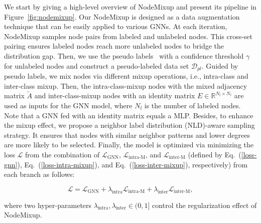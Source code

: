 \documentclass[letterpaper]{article} %
\begin{document}
We start by giving a high-level overview of NodeMixup and present its pipeline in Figure~\ref{fig:nodemixup}. Our NodeMixup is designed as a data augmentation technique that can be easily applied to various GNNs. At each iteration, NodeMixup samples node pairs from labeled and unlabeled nodes. This cross-set pairing ensures labeled nodes reach more unlabeled nodes to bridge the distribution gap. Then, we use the pseudo labels~\cite{pl} with a confidence threshold $\gamma$ for unlabeled nodes and construct a pseudo-labeled data set $\mathcal{D}_{pl}$. Guided by pseudo labels, we mix nodes via different mixup operations, i.e., intra-class and inter-class mixup. Then, the intra-class-mixup nodes with the mixed adjacency matrix $\tilde{A}$ and inter-class-mixup nodes with an identity matrix $E \in \mathbb{R}^{N_{l} \times N_{l}}$ are used as inputs for the GNN model, where $N_{l}$ is the number of labeled nodes. Note that a GNN fed with an identity matrix equals a MLP. Besides, to enhance the mixup effect, we propose a neighbor label distribution (NLD)-aware sampling strategy. It ensures that nodes with similar neighbor patterns and lower degrees are more likely to be selected. Finally, the model is optimized via minimizing the loss $\mathcal{L}$ from the combination of $\mathcal{L}_{\text{GNN}}$, $\mathcal{L}_{\text{intra-M}}$, and $\mathcal{L}_{\text{inter-M}}$ (defined by Eq.~(\ref{loss-gnn}), Eq.~(\ref{loss-intra-mixup}), and Eq.~(\ref{loss-inter-mixup}), respectively) from each branch as follows:
\begin{small}
	\begin{equation}
	\mathcal{L} = \mathcal{L}_{\text{GNN}} + \lambda_{\text{intra}}\mathcal{L}_{\text{intra-M}} + \lambda_{\text{inter}}\mathcal{L}_{\text{inter-M}},
\end{equation}
\end{small}where two hyper-parameters $\lambda_{\text{intra}}, \lambda_{\text{inter}} \in (0,1]$ control the regularization effect of NodeMixup.
\end{document}
